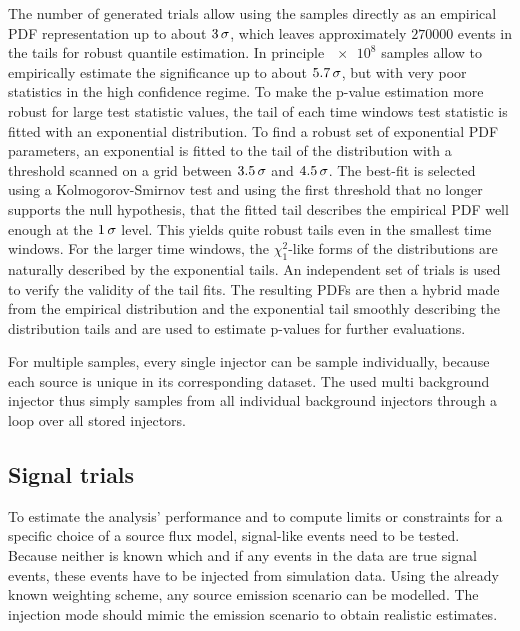 The number of generated trials allow using the samples directly as an empirical PDF representation up to about $\num{3}\,\sigma$, which leaves approximately $\num{270000}$ events in the tails for robust quantile estimation.
In principle $\num{e8}$ samples allow to empirically estimate the significance up to about $\num{5.7}\,\sigma$, but with very poor statistics in the high confidence regime.
To make the p-value estimation more robust for large test statistic values, the tail of each time windows test statistic is fitted with an exponential distribution.
To find a robust set of exponential PDF parameters, an exponential is fitted to the tail of the distribution with a threshold scanned on a grid between $\num{3.5}\,\sigma$ and $\num{4.5}\,\sigma$.
The best-fit is selected using a Kolmogorov-Smirnov test  and using the first threshold that no longer supports the null hypothesis, that the fitted tail describes the empirical PDF well enough at the $\num{1}\,\sigma$ level.
This yields quite robust tails even in the smallest time windows.
For the larger time windows, the $\chi^2_1$-like forms of the distributions are naturally described by the exponential tails.
An independent set of trials is used to verify the validity of the tail fits.
The resulting PDFs are then a hybrid made from the empirical distribution and the exponential tail smoothly describing the distribution tails and are used to estimate p-values for further evaluations.

For multiple samples, every single injector can be sample individually, because each source is unique in its corresponding dataset.
The used multi background injector thus simply samples from all individual background injectors through a loop over all stored injectors.


\subsection*{Signal trials}
To estimate the analysis' performance and to compute limits or constraints for a specific choice of a source flux model, signal-like events need to be tested.
Because neither is known which and if any events in the data are true signal events, these events have to be injected from simulation data.
Using the already known weighting scheme, any source emission scenario can be modelled.
The injection mode should mimic the emission scenario to obtain realistic estimates.

